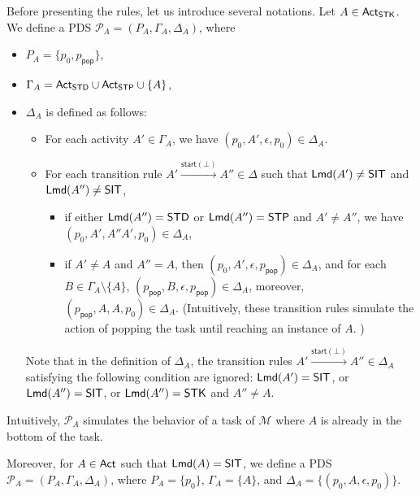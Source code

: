 \documentclass[preprint,12pt]{elsarticle}
\newcommand\Mm{{\mathcal{M} }}
\newcommand\Pp{{\mathcal{P} }}
\newcommand\act{{\sf Act}}
\newcommand\lmd{{\sf Lmd}}
\newcommand\standard{{\sf STD}}
\newcommand\singletop{{\sf STP}}
\newcommand\singletask{{\sf STK}}
\newcommand\singleinstance{{\sf SIT}}
\newcommand\startactivity{{\mathsf{start} }}
\newcommand{\STD}{\mathsf{STD}}
\newcommand{\STP}{\mathsf{STP}}
\newcommand{\PDS}{\textsf{PDS}}
\newcommand\pop{\mathsf{pop}}
\begin{document}
Before presenting the rules, let us introduce several notations. Let $A \in \act_\singletask$. 
We define a {\PDS} $\Pp_{A} = (P_A, \Gamma_{A}, \Delta_{A})$, where 
\begin{itemize}
\item $P_A = \{p_0, p_{\pop}\}$, 
\item $\Gamma_{A} = \act_{\standard} \cup \act_{\singletop} \cup \{A\}$, 
\item $\Delta_{A}$ is defined as follows: 
\begin{itemize}
%
\item For each activity $A' \in \Gamma_A $, we have $(p_0, A', \epsilon, p_0) \in \Delta_{A}$.
%
\item For each transition rule $A' \xrightarrow{\startactivity(\bot)} A'' \in \Delta$ such that $\lmd(A') \neq \singleinstance$ and $\lmd(A'') \neq  \singleinstance$, 
\begin{itemize}
    \item if either $\lmd(A'') = \STD$ or $\lmd(A'') = \singletop$ and $A' \neq A''$, we have $(p_0, A', A''A', p_0) \in \Delta_{A}$,    
    \item if $A' \neq A$ and $A'' = A$, then $(p_0, A', \epsilon, p_{\pop}) \in \Delta_{A}$, and for each $B \in \Gamma_{A} \setminus \{A\}$, $(p_{\pop}, B, \epsilon, p_{\pop}) \in \Delta_{A}$, moreover, $(p_{\pop}, A, A, p_0) \in \Delta_{A}$. (Intuitively, these transition rules simulate the action of popping the task until reaching an instance of $A$. )
\end{itemize}
\end{itemize}
Note that in the definition of $\Delta_{A}$, the transition rules $A' \xrightarrow{\startactivity(\bot)} A'' \in \Delta_A$ satisfying the following condition are ignored: $\lmd(A') = \singleinstance$, or $\lmd(A'') = \singleinstance$, or $\lmd(A'') = \singletask$ and $A'' \neq A$. 
\end{itemize}
Intuitively, $\Pp_{A}$ simulates the behavior of a task of $\Mm$ where $A$ is already in the bottom of the task. 

Moreover, for $A \in \act$ such that $\lmd(A) = \singleinstance$, we define a {\PDS} $\Pp_A  = (P_A, \Gamma_A, \Delta_A)$, where $P_A = \{p_0\}$, $\Gamma_A = \{A\}$, and $\Delta_A = \{(p_0, A, \epsilon, p_0)\}$.
\end{document}
